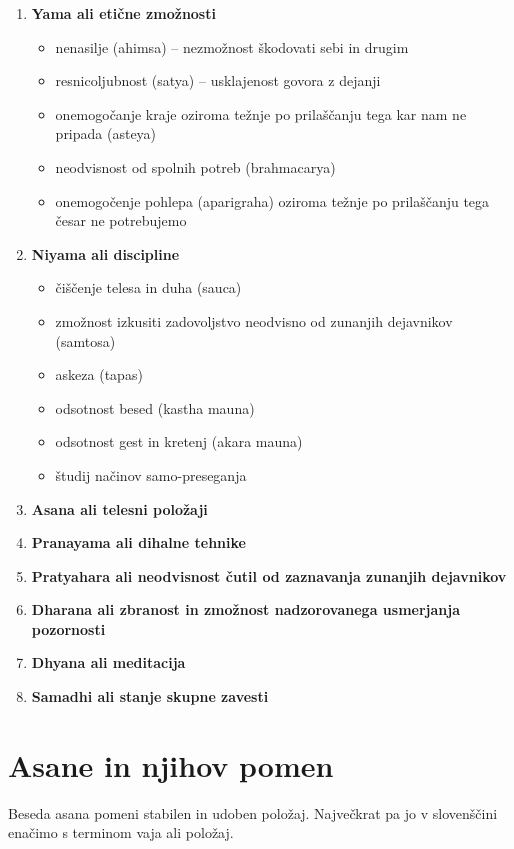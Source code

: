 \documentclass[a4paper, 12pt]{book}
\begin{document}
\begin{enumerate}
	\item \textbf{Yama ali etične zmožnosti} 
		\begin{itemize}
			\item nenasilje (ahimsa) – nezmožnost škodovati sebi in drugim
			\item resnicoljubnost (satya) – usklajenost govora z dejanji
			\item onemogočanje kraje oziroma težnje po prilaščanju tega kar nam ne pripada (asteya)
			\item neodvisnost od spolnih potreb (brahmacarya)
			\item onemogočenje pohlepa (aparigraha) oziroma težnje po prilaščanju tega česar ne potrebujemo
		\end{itemize}
	
	\item \textbf{Niyama ali discipline}
		\begin{itemize}
			\item čiščenje telesa in duha (sauca)
			\item zmožnost izkusiti zadovoljstvo neodvisno od zunanjih dejavnikov (samtosa)
			\item askeza (tapas)
			\item odsotnost besed (kastha mauna)
			\item odsotnost gest in kretenj (akara mauna)
			\item študij načinov samo-preseganja
		\end{itemize}

	\item \textbf{Asana ali telesni položaji}
	\item \textbf{Pranayama ali dihalne tehnike}
	\item \textbf{Pratyahara ali neodvisnost čutil od zaznavanja zunanjih dejavnikov}
	\item \textbf{Dharana ali zbranost in zmožnost nadzorovanega usmerjanja pozornosti}
	\item \textbf{Dhyana ali meditacija}
	\item \textbf{Samadhi ali stanje skupne zavesti}
\end{enumerate}


\section{Asane in njihov pomen}
Beseda asana pomeni stabilen in udoben položaj. Največkrat pa jo v slovenščini enačimo s terminom vaja ali položaj.
\end{document}

